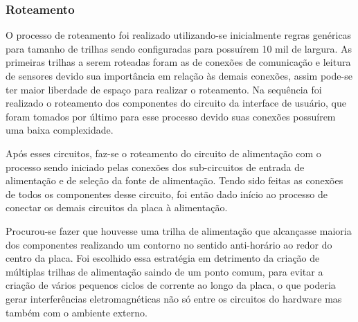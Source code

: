 \newpage


\subsubsection{Roteamento}

O processo de roteamento foi realizado utilizando-se inicialmente regras genéricas para tamanho de trilhas sendo configuradas para possuírem 10 mil de largura. As primeiras trilhas a serem roteadas foram as de conexões de comunicação e leitura de sensores devido sua importância em relação às demais conexões, assim pode-se ter maior liberdade de espaço para realizar o roteamento. Na sequência foi realizado o roteamento dos componentes do circuito da interface de usuário, que foram tomados por último para esse processo devido suas conexões possuírem uma baixa complexidade. 


    \begin{figure}[h!]
            \captionsetup{width=10cm}
   \end{figure}



Após esses circuitos, faz-se o roteamento do circuito de alimentação com o processo sendo iniciado pelas conexões dos sub-circuitos de entrada de alimentação e de seleção da fonte de alimentação. Tendo sido feitas as conexões de todos os componentes desse circuito, foi então dado início ao processo de conectar os demais circuitos da placa à alimentação.

Procurou-se fazer que houvesse uma trilha de alimentação que alcançasse maioria dos componentes realizando um contorno no sentido anti-horário ao redor do centro da placa. Foi escolhido essa estratégia em detrimento da criação de múltiplas trilhas de alimentação saindo de um ponto comum, para evitar a criação de vários pequenos ciclos de corrente ao longo da placa, o que poderia gerar interferências eletromagnéticas não só entre os circuitos do hardware mas também com o ambiente externo. 
    
